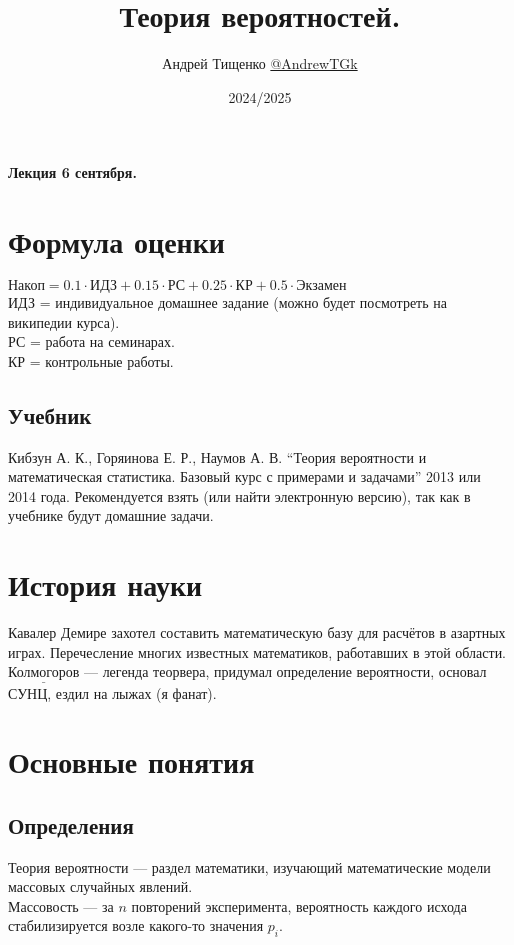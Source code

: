 \documentclass[12pt, a4paper]{article}
\title{Теория вероятностей.}
\author{Андрей Тищенко \href{https://t.me/AndrewTGk}{@AndrewTGk}}
\date{2024/2025}
\begin{document}
    \maketitle
    \begin{center}
        \textbf{Лекция 6 сентября.}
    \end{center}

  \section*{Формула оценки}

  $\text{Накоп} = 0.1 \cdot \text{ИДЗ} + 0.15 \cdot \text{РС} + 0.25 \cdot \text{КР} + 0.5\cdot\text{Экзамен}$\\
  ИДЗ = индивидуальное домашнее задание (можно будет посмотреть на википедии курса).\\
  РС = работа на семинарах.\\
  КР = контрольные работы.
  \subsection*{Учебник}
    Кибзун А. К., Горяинова Е. Р., Наумов А. В. ``Теория 
    вероятности и математическая статистика. Базовый курс 
    с примерами и задачами'' 2013 или 2014 года. Рекомендуется взять (или найти электронную версию), так как в учебнике будут домашние задачи.
  \section*{История науки}
    Кавалер Демире захотел составить математическую базу для расчётов в азартных играх. Перечесление многих 
    известных математиков, работавших в этой области. $\underline{\text{Колмогоров}}$ --- легенда
    теорвера, придумал определение вероятности, основал СУНЦ, ездил на лыжах (я фанат).\\
    \section*{Основные понятия}
    \subsection*{Определения}
    $\textit{Теория вероятности}$ --- раздел математики, изучающий математические модели массовых случайных явлений.\\
    $\textit{Массовость}$ --- за $n$ повторений эксперимента, вероятность каждого исхода стабилизируется возле какого-то значения $p_i$.\\
\end{document}
